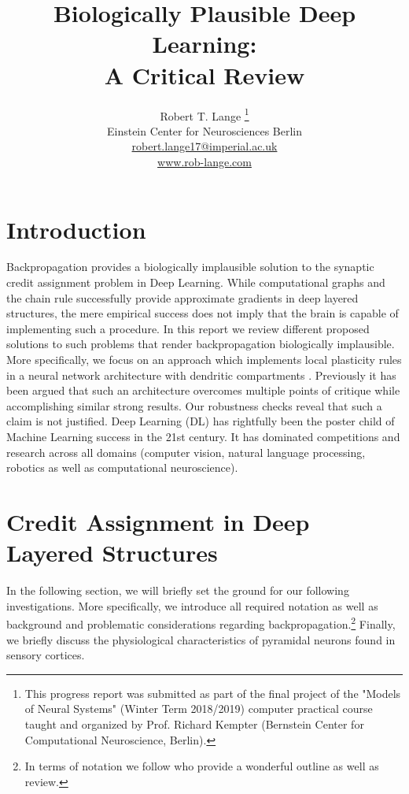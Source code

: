 \documentclass[colorinlistoftodos]{article}
\title{Biologically Plausible Deep Learning: \\
		A Critical Review}
\author{
  Robert T. Lange \thanks{This progress report was submitted as part of the final project of the "Models of Neural Systems" (Winter Term 2018/2019) computer practical course taught and organized by Prof. Richard Kempter (Bernstein Center for Computational Neuroscience, Berlin).} \\
  Einstein Center for Neurosciences Berlin\\
  \url{robert.lange17@imperial.ac.uk} \\
  \url{www.rob-lange.com} \\
}
\theoremstyle{definition}
\begin{document}
\maketitle




\section{Introduction}

Backpropagation provides a biologically implausible solution to the synaptic credit assignment problem in Deep Learning. While computational graphs and the chain rule successfully provide approximate gradients in deep layered structures, the mere empirical success does not imply that the brain is capable of implementing such a procedure. 
In this report we review different proposed solutions to such problems that render backpropagation biologically implausible. More specifically, we focus on an approach which implements local plasticity rules in a neural network architecture with dendritic compartments \citep{guerguiev2017}.
Previously it has been argued that such an architecture overcomes multiple points of critique while accomplishing similar strong results. Our robustness checks reveal that such a claim is not justified.
Deep Learning (DL) has rightfully been the poster child of Machine Learning success in the 21st century. It has dominated competitions and research across all domains (computer vision, natural language processing, robotics as well as computational neuroscience). 

\newpage
\section{Credit Assignment in Deep Layered Structures}

In the following section, we will briefly set the ground for our following investigations. More specifically, we introduce all required notation as well as background and problematic considerations regarding backpropagation.\footnote{In terms of notation we follow \citet{bartunov2018} who provide a wonderful outline as well as review.} Finally, we briefly discuss the physiological characteristics of pyramidal neurons found in sensory cortices. 
\end{document}
